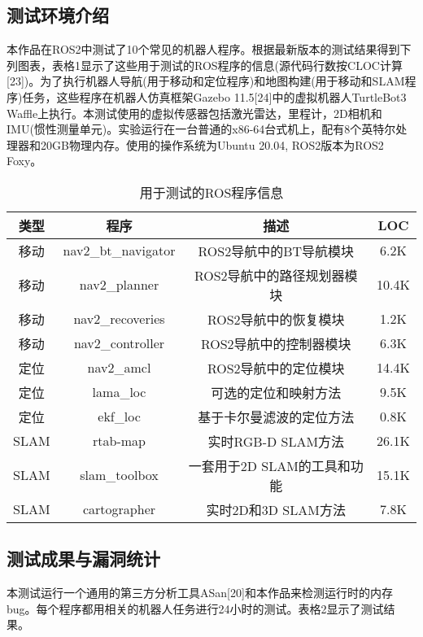 \subsection{测试环境介绍}
本作品在ROS2中测试了10个常见的机器人程序。根据最新版本的测试结果得到下列图表，表格1显示了这些用于测试的ROS程序的信息(源代码行数按CLOC计算{[}23{]})。为了执行机器人导航(用于移动和定位程序)和地图构建(用于移动和SLAM程序)任务，这些程序在机器人仿真框架Gazebo
11.5{[}24{]}中的虚拟机器人TurtleBot3
Waffle上执行。本测试使用的虚拟传感器包括激光雷达，里程计，2D相机和IMU(惯性测量单元)。实验运行在一台普通的x86-64台式机上，配有8个英特尔处理器和20GB物理内存。使用的操作系统为Ubuntu
20.04, ROS2版本为ROS2 Foxy。
\begin{table}[H]
	\small
	\caption{用于测试的ROS程序信息}
	\label{tb:ros_test}
	\centering
	\begin{tabular}{cccc}
		\hline  
		\textbf{类型} & \textbf{程序} & \textbf{描述} & \textbf{LOC} \\ 
		\hline  
		移动 & nav2\_bt\_navigator & ROS2导航中的BT导航模块 & 6.2K \\
		移动 & nav2\_planner & ROS2导航中的路径规划器模块 & 10.4K \\
		移动 & nav2\_recoveries & ROS2导航中的恢复模块 & 1.2K \\
		移动 & nav2\_controller & ROS2导航中的控制器模块 & 6.3K \\
		定位 & nav2\_amcl & ROS2导航中的定位模块 & 14.4K \\
		定位 & lama\_loc & 可选的定位和映射方法 & 9.5K \\
		定位 & ekf\_loc & 基于卡尔曼滤波的定位方法 & 0.8K \\
		SLAM & rtab-map & 实时RGB-D SLAM方法 & 26.1K \\
		SLAM & slam\_toolbox & 一套用于2D SLAM的工具和功能 & 15.1K \\
		SLAM & cartographer & 实时2D和3D SLAM方法 & 7.8K \\
		\hline
	\end{tabular} 
\end{table}

\subsection{测试成果与漏洞统计}
本测试运行一个通用的第三方分析工具ASan{[}20{]}和本作品来检测运行时的内存bug。每个程序都用相关的机器人任务进行24小时的测试。表格2显示了测试结果。

